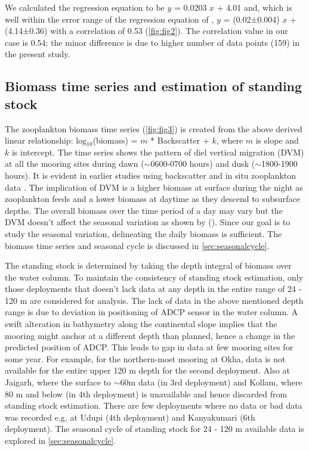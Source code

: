 \documentclass{article}
\begin{document}
	We calculated the regression equation to be $y$ = 0.0203 $x$  + 4.01 and, which is well within the error range of the regression equation of \citep{aparna2022seasonal}, $y$ = (0.02±0.004) $x$ + (4.14±0.36) with a correlation of 0.53 (\cref{fig:fig2}). The correlation value in our case is 0.54; the minor difference is  due to higher number of data points (159) in the present study. 
	
	\subsection{Biomass time series and estimation of standing stock}
	
	The zooplankton biomass time series (\cref{fig:fig3}) is created from the above derived linear relationship: log$_{10}$(biomass) = $m$ * Backscatter + $k$, where $m$ is slope and $k$ is intercept. The time series shows the pattern of diel vertical migration (DVM) at all the mooring sites during dawn ($\sim$0600-0700 hours) and dusk ($\sim$1800-1900 hours). It is evident in earlier studies using backscatter \citep{ashjian2002distribution, smith2005mesozooplankton, inoue2016diel,ursella2018evidence} and in situ zooplankton data \citep{padmavati1998vertical}. The implication of DVM is a higher biomass at surface during the night as zooplankton feeds and a lower biomass at daytime as they descend to subsurface depths. The overall biomass over the time period of a day may vary but the DVM doesn't affect the seasonal variation as shown by (\citep{jiang2007temporal,aparna2022seasonal}). Since our goal is to study the seasonal variation, delineating the daily biomass is sufficient. The biomass time series and seasonal cycle is discussed in \autoref{sec:seasonalcycle}.
	
	The standing stock is determined by taking the depth integral of biomass over the water column. To maintain the consistency of standing stock estimation, only those deployments that doesn't lack data at any depth in the entire range of 24 - 120 m are considered for analysis. The lack of data in the above mentioned depth range is due to deviation in positioning of ADCP sensor in the water column. A swift alteration in bathymetry along the continental slope implies that the mooring might anchor at a different depth than planned, hence a change in the predicted position of ADCP. This leads to gap in data at few mooring sites for some year. For example, for the northern-most mooring at Okha, data is not available for the entire upper 120 m depth for the second deployment. Also at Jaigarh, where the surface to $\sim$60m data (in 3rd deployment) and Kollam, where 80 m and below (in 4th deployment) is unavailable and hence discarded from standing stock estimation. There are few deployments where no data or bad data was recorded e.g, at Udupi (4th deployment) and Kanyakumari (6th deployment). The seasonal cycle of standing stock for 24 - 120 m available data is explored in \autoref{sec:seasonalcycle}.
	
\end{document}
